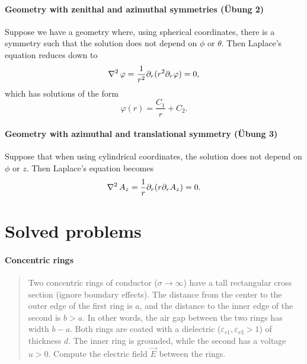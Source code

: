 \documentclass[margin=small]{tex/hsrzf}
\theoremstyle{elmagzf}
\begin{document}
\paragraph{Geometry with zenithal and azimuthal symmetries (\"Ubung 2)}

Suppose we have a geometry where, using spherical coordinates, there is a
symmetry such that the solution does not depend on \(\phi\) or \(\theta\).
Then Laplace's equation reduces down to
\[
  \operatorname{\nabla^2} \varphi = \frac{1}{r^2} \partial_r ( r^2 \partial_r \varphi) = 0,
\]
which has solutions of the form
\[
  \varphi(r) = \frac{C_1}{r} + C_2.
\]

\paragraph{Geometry with azimuthal and translational symmetry (\"Ubung 3)}

Suppose that when using cylindrical coordinates, the solution does not depend
on \(\phi\) or \(z\). Then Laplace's equation becomes
\[
  \operatorname{\nabla^2} A_z = \frac{1}{r} \partial_r (r \partial_r A_z) = 0.
\]

\section{Solved problems}

\paragraph{Concentric rings}
\begin{quote}
  Two concentric rings of conductor (\(\sigma \to \infty\)) have a tall
  rectangular cross section (ignore boundary effects). The distance from the
  center to the outer edge of the first ring is \(a\), and the distance to the
  inner edge of the second is \(b > a\).  In other words, the air gap between
  the two rings has width \(b - a\).  Both rings are coated with a dielectric
  (\(\varepsilon_{r1}, \varepsilon_{r3} > 1\)) of thickness \(d\). The inner
  ring is grounded, while the second has a voltage \(u > 0\).  Compute the
  electric field \(\vec{E}\) between the rings.
\end{quote}
\end{document}
